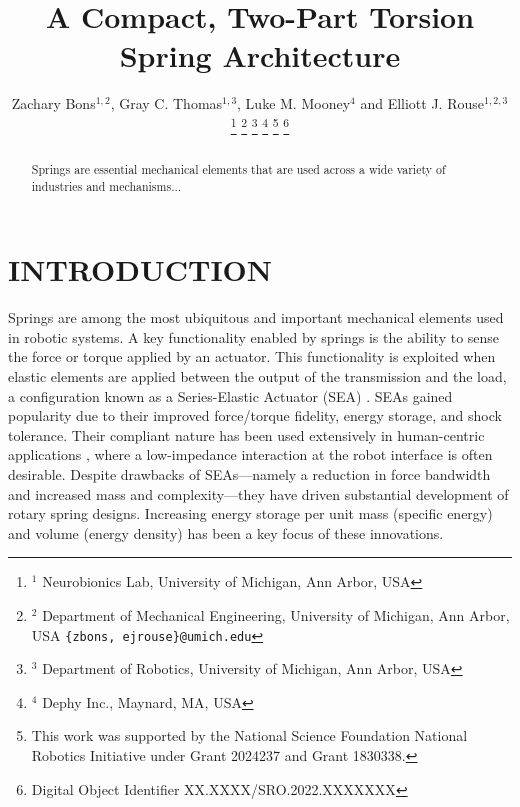 \documentclass[letterpaper, 10 pt, conference]{ieeeconf} %
\title{\LARGE \bf A Compact, Two-Part Torsion Spring Architecture}
\author{Zachary Bons$^{1,2}$, Gray C. Thomas$^{1,3}$, Luke M. Mooney$^{4}$ and Elliott J. Rouse$^{1,2,3}$%
\thanks{$^{1}$ Neurobionics Lab, University of Michigan, Ann Arbor, USA}%
\thanks{$^{2}$ Department of Mechanical Engineering, University of Michigan, Ann Arbor, USA {\tt\small \{zbons, ejrouse\}@umich.edu}}%
\thanks{$^{3}$ Department of Robotics, University of Michigan, Ann Arbor, USA}%
\thanks{$^{4}$ Dephy Inc., Maynard, MA, USA}%
\thanks{This work was supported by the National Science Foundation National Robotics Initiative under Grant 2024237 and Grant 1830338.}%
\thanks{Digital Object Identifier XX.XXXX/SRO.2022.XXXXXXX}
}
\begin{document}
\maketitle
\thispagestyle{empty}
\pagestyle{empty}

\begin{abstract}
Springs are essential mechanical elements that are used across a wide variety of industries and mechanisms...
\end{abstract}


\section{INTRODUCTION} \label{sec:intro}
Springs are among the most ubiquitous and important mechanical elements used in robotic systems. A key functionality enabled by springs is the ability to sense the force or torque applied by an actuator. This functionality is exploited when elastic elements are applied between the output of the transmission and the load, a configuration known as a Series-Elastic Actuator (SEA) \cite{PrattWilliamson1995IROS}. SEAs gained popularity due to their improved force/torque fidelity, energy storage, and shock tolerance. Their compliant nature has been used extensively in human-centric applications \cite{Pratt2002IR,FitzgeraldBaxter2013,KongBaeTomizuka2009TMech,ShepherdRouseExo2017}, where a low-impedance interaction at the robot interface is often desirable. Despite drawbacks of SEAs---namely a reduction in force bandwidth and increased mass and complexity---they have driven substantial development of rotary spring designs. Increasing energy storage per unit mass (specific energy) and volume (energy density) has been a key focus of these innovations.
\end{document}

